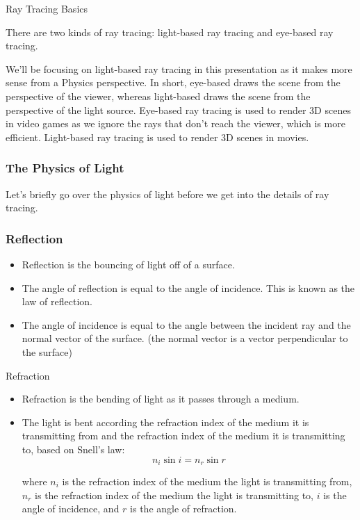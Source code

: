 \documentclass{beamer}
\begin{document}
  \begin{frame}{Ray Tracing Basics}

    There are two kinds of ray tracing: light-based ray tracing and eye-based ray tracing.

    \hfill

    We'll be focusing on light-based ray tracing in this presentation as it makes more sense from a Physics perspective.
    In short, eye-based draws the scene from the perspective of the viewer, whereas light-based draws the scene from the perspective of the light source.
    Eye-based ray tracing is used to render 3D scenes in video games as we ignore the rays that don't reach the viewer, which is more efficient.
    Light-based ray tracing is used to render 3D scenes in movies.

  \end{frame}

  \begin{frame}
    \frametitle{The Physics of Light}
    Let's briefly go over the physics of light before we get into the details of ray tracing.
  \end{frame}

  \begin{frame}
    \frametitle{Reflection}
    \begin{itemize}
      \item Reflection is the bouncing of light off of a surface.
      \item The angle of reflection is equal to the angle of incidence.
      This is known as the law of reflection.
      \item The angle of incidence is equal to the angle between the incident ray and the normal vector of the surface. (the normal vector is a vector perpendicular to the surface)
    \end{itemize}

  \end{frame}

  \begin{frame}{Refraction}
    \begin{itemize}
      \item Refraction is the bending of light as it passes through a medium.
      \item The light is bent according the refraction index of the medium it is transmitting from and the refraction index of the medium it is transmitting to, based on Snell's law:
      \[ n_i \sin i = n_r \sin r \]

      where \(n_i\) is the refraction index of the medium the light is transmitting from, \(n_r\) is the refraction index of the medium the light is transmitting to, \(i\) is the angle of incidence, and \(r\) is the angle of refraction.
    \end{itemize}

  \end{frame}
\end{document}
